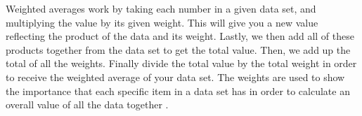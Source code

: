 		Weighted averages work by taking each number in a given data set, and 
		multiplying the value by its given weight. This will give you a new 
		value reflecting the product of the data and its weight. Lastly, we then 
		add all of these products together from the data set to get the total 
		value. Then, we add up the total of all the weights. Finally divide the 
		total value by the total weight in order to receive the weighted average 
		of your data set. The weights are used to show the importance that each 
		specific item in a data set has in order to calculate an overall value 
		of all the data together \cite{economic}.
